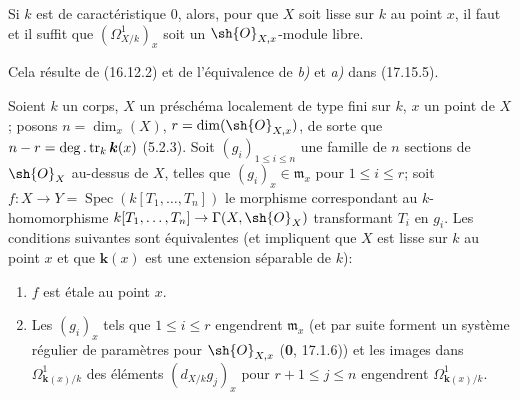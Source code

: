 \begin{corollary}[17.15.7]
\label{IV.17.15.7}
Si $k$ est de caractéristique \textup{0}, alors, pour que $X$ soit lisse sur $k$ au point $x$, il faut et il suffit que $(\varOmega^1_{X/k})_x$ soit un $\sh{O}_{X,x}$-module libre.
\end{corollary}

Cela résulte de (16.12.2) et de l'équivalence de \emph{b)} et \emph{a)} dans (17.15.5).

\begin{proposition}[17.15.8]
\label{IV.17.15.8}
Soient $k$ un corps, $X$ un préschéma localement de type fini sur $k$, $x$ un point de $X$; posons $n=\dim_x(X)$, $r=\dim(\sh{O}_{X,x})$, de sorte que $n- r=\deg.\operatorname{tr}_k \boldsymbol{k}(x)$ \textup{(5.2.3)}. Soit $(g_i)_{1\leq i\leq n}$ une famille de $n$ sections de $\sh{O}_X$ au-dessus de $X$, telles que $(g_i)_x\in\mathfrak m_x$ pour $1\leq i\leq r$; soit $f:X\to Y=\operatorname{Spec}(k[T_1,\ldots,T_n])$ le morphisme correspondant au $k$-homomorphisme $k[T_1,\ldots,T_n]\to\Gamma(X,\sh{O}_X)$ transformant $T_i$ en $g_i$. Les conditions suivantes sont équivalentes (et impliquent que $X$ est lisse sur $k$ au point $x$ et que $\boldsymbol{k}(x)$ est une extension séparable de $k$):
\begin{enumerate}
  \item[\textup{a)}] $f$ est étale au point $x$.


  \item[\textup{b)}] Les $(g_i)_x$ tels que $1\leq i\leq r$ engendrent $\mathfrak m_x$ \textup{(et par suite forment un système régulier de paramètres pour $\sh{O}_{X,x}$ (\textbf{0}, 17.1.6))} et les images dans $\Omega^1_{\mathbf{k}(x)/k}$ des éléments $(d_{X/k}g_j)_x$ pour $r+1\leq j\leq n$ engendrent $\Omega^1_{\mathbf{k}(x)/k}$.
\end{enumerate}
\end{proposition}

